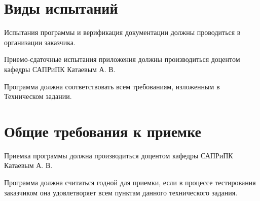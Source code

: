 \documentclass[a4paper,english]{G2-105}
\begin{document}
\section{Виды испытаний}
\par Испытания программы и верификация документации должны проводиться в организации заказчика.
\par Приемо-сдаточные испытания приложения должны производиться доцентом кафедры САПРиПК Катаевым А. В. 
\par Программа должна соответствовать всем требованиям, изложенным в Техническом задании.
\section{Общие требования к приемке}
\par Приемка программы должна производиться доцентом кафедры
САПРиПК Катаевым А. В.
\par Программа должна считаться годной для приемки, если в процессе
тестирования заказчиком она удовлетворяет всем пунктам данного
технического задания.
\end{document}
